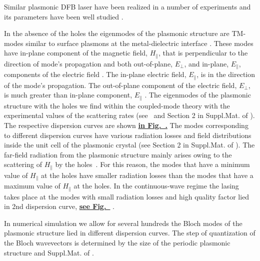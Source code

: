 \documentclass[aps,pra,amsmath,amssymb,onecolumn,superscriptaddress,showpacs,floatfix,]{revtex4-1}
\begin{document}
Similar plasmonic DFB laser have been realized in a number of experiments \cite{BeijnumPRL,TennerJOpt,TennerACSPhot} and its parameters have been well studied \cite{BeijnumPRL,TennerJOpt,TennerACSPhot,nefedkin2018acsphot}.

In the absence of the holes the eigenmodes of the plasmonic structure are TM-modes similar to surface plasmons at the metal-dielectric interface \cite{TennerJOpt,TennerACSPhot}. 
These modes have in-plane component of the magnetic field, $H_{\parallel}$, that is perpendicular to the direction of mode's propagation and both out-of-plane, $E_{\perp}$, and in-plane, $E_{\parallel}$, components of the electric field \cite{TennerJOpt,TennerACSPhot}. 
The in-plane electric field, $E_{\parallel}$, is in the direction of the mode's propagation. 
The out-of-plane component of the electric field, $E_{\perp}$, is much greater than in-plane component, $E_{\parallel}$ \cite{TennerJOpt,TennerACSPhot}.
The eigenmodes of the plasmonic structure with the holes we find within the coupled-mode theory with the experimental values of the scattering rates (see~\cite{TennerJOpt} and Section 2 in Suppl.Mat. of \cite{nefedkin2018acsphot}). The respective dispersion curves are shown \textbf{\underline{in Fig.~.}} The modes corresponding to different dispersion curves have various radiation losses and field distributions inside the unit cell of the plasmonic crystal (see Section 2 in Suppl.Mat. of \cite{nefedkin2018acsphot}). The far-field radiation from the plasmonic structure mainly arises owing to the scattering of $H_{\parallel}$ by the holes~\cite{TennerJOpt}. 
For this reason, the modes that have a minimum value of $H_{\parallel}$ at the holes have smaller radiation losses than the modes that have a maximum value of $H_{\parallel}$ at the holes.
In the continuous-wave regime the lasing takes place at the modes with small radiation losses and high quality factor lied in 2nd dispersion curve, \textbf{\underline{see Fig.~}} \cite{TennerJOpt,nefedkin2018acsphot}.

In numerical simulation we allow for several hundreds the Bloch modes of the plasmonic structure lied in different dispersion curves. The step of quantization of the Bloch wavevectors is determined by the size of the periodic plasmonic structure \cite{nefedkin2018acsphot} and Suppl.Mat. of \cite{nefedkin2018acsphot}.
\end{document}
